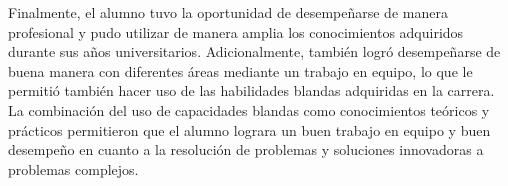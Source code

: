   Finalmente, el alumno tuvo la oportunidad de desempeñarse de manera profesional y pudo utilizar de manera amplia los conocimientos adquiridos durante sus años universitarios. Adicionalmente, también logró desempeñarse de buena manera con diferentes áreas mediante un trabajo en equipo, lo que le permitió también hacer uso de las habilidades blandas adquiridas en la carrera. La combinación del uso de capacidades blandas como conocimientos teóricos y prácticos permitieron que el alumno lograra un buen trabajo en equipo y buen desempeño en cuanto a la resolución de problemas y soluciones innovadoras a problemas complejos.